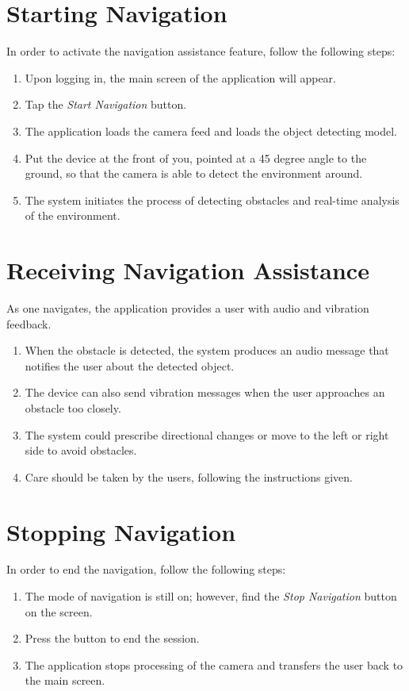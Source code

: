 \documentclass{FastFyp}
\begin{document}
\section{Starting Navigation}

In order to activate the navigation assistance feature, follow the following steps:

\begin{enumerate}
\item Upon logging in, the main screen of the application will appear.
\item Tap the \textit{Start Navigation} button.
\item The application loads the camera feed and loads the object detecting model.
\item Put the device at the front of you, pointed at a 45 degree angle to the ground, so that the camera is able to detect the environment around.
\item The system initiates the process of detecting obstacles and real-time analysis of the environment.
\end{enumerate}

\section{Receiving Navigation Assistance}

As one navigates, the application provides a user with audio and vibration feedback.

\begin{enumerate}
\item When the obstacle is detected, the system produces an audio message that notifies the user about the detected object.
\item The device can also send vibration messages when the user approaches an obstacle too closely.
\item The system could prescribe directional changes or move to the left or right side to avoid obstacles.
\item Care should be taken by the users, following the instructions given.
\end{enumerate}

\section{Stopping Navigation}

In order to end the navigation, follow the following steps:

\begin{enumerate}
\item The mode of navigation is still on; however, find the \textit{Stop Navigation} button on the screen.
\item Press the button to end the session.
\item The application stops processing of the camera and transfers the user back to the main screen.

\end{enumerate}
\end{document}

